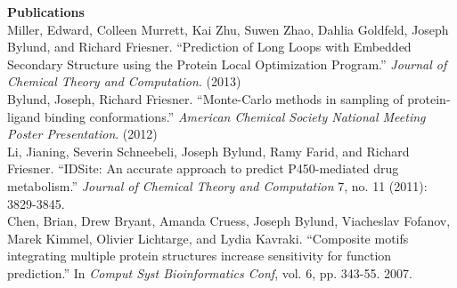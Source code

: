 \vspace{\mybigskip}
\vspace{\mybigskip}
\myfontsize{\littleheader}
\textbf{Publications}\\
\myfontsize{\bodysize}
\vspace{1ex}
Miller, Edward, Colleen Murrett, Kai Zhu, Suwen Zhao, Dahlia Goldfeld, Joseph Bylund, and Richard Friesner. ``Prediction of Long Loops with Embedded Secondary Structure using the Protein Local Optimization Program.'' \textit{Journal of Chemical Theory and Computation}. (2013)\\
\vspace{1ex}
Bylund, Joseph, Richard Friesner. ``Monte-Carlo methods in sampling of protein-ligand binding conformations.'' \textit{American Chemical Society National Meeting Poster Presentation}. (2012)\\
\vspace{1ex}
Li, Jianing, Severin Schneebeli, Joseph Bylund, Ramy Farid, and Richard Friesner. ``IDSite: An accurate approach to predict P450-mediated drug metabolism.'' \textit{Journal of Chemical Theory and Computation} 7, no. 11 (2011): 3829-3845.\\
\vspace{1ex}
Chen, Brian, Drew Bryant, Amanda Cruess, Joseph Bylund, Viacheslav Fofanov, Marek Kimmel, Olivier Lichtarge, and Lydia Kavraki. ``Composite motifs integrating multiple protein structures increase sensitivity for function prediction.'' In \textit{Comput Syst Bioinformatics Conf}, vol. 6, pp. 343-55. 2007.\\

